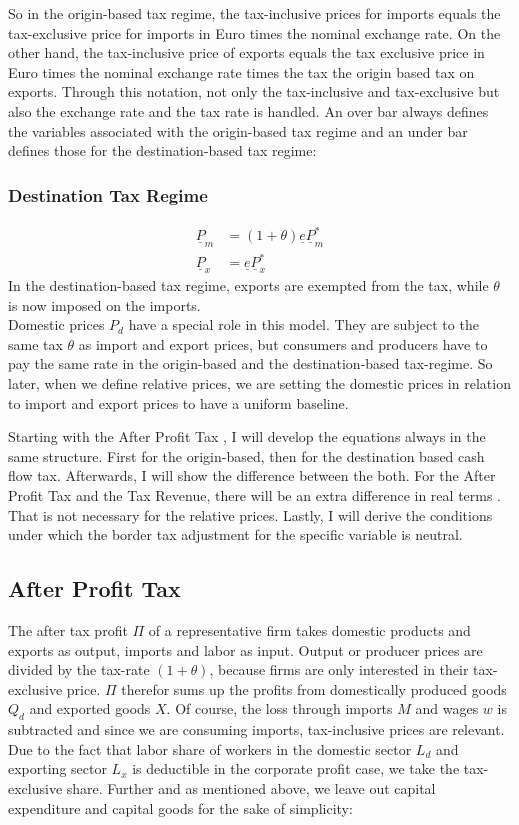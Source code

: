 \noindent So in the origin-based tax regime, the tax-inclusive prices for imports equals the tax-exclusive price for imports in Euro times the nominal exchange rate. On the other hand, the tax-inclusive price of exports equals the tax exclusive price in Euro times the nominal exchange rate times the tax the origin based tax on exports. Through this notation, not only the tax-inclusive and tax-exclusive but also the exchange rate and the tax rate is handled. An over bar always defines the variables associated with the origin-based tax regime and an under bar defines those for the destination-based tax regime:

\subsubsection*{Destination Tax Regime}
\begin{equation}\label{D.Tax}
\begin{aligned}
\underline P_m &=  \left( 1+\theta \right) \underline e\underline P^*_m \\
\underline P_x &= \underline e \underline P^*_x 
\end{aligned}
\end{equation}
In the destination-based tax regime, exports are exempted from the tax, while $\theta$ is now imposed on the imports.\\
Domestic prices $P_d$ have a special role in this model. They are subject to the same tax $\theta$ as import and export prices, but consumers and producers have to pay the same rate in the origin-based and the destination-based tax-regime. So later, when we define relative prices, we are setting the domestic prices in relation to import and export prices to have a uniform baseline. 


Starting with the After Profit Tax , I will develop the equations always in the same structure. First for the origin-based, then for the destination based cash flow tax. Afterwards, I will show the difference between the both. For the After Profit Tax and the Tax Revenue, there will be an extra difference in real terms . That is not necessary for the relative prices. Lastly, I will derive the conditions under which the border tax adjustment for the specific variable is neutral. 


\subsection*{After Profit Tax}
The after tax profit $\Pi$ of a representative firm takes domestic products  and exports as output, imports and labor as input. Output or producer prices are divided by the tax-rate $(1+\theta)$, because firms are only interested in their tax-exclusive price. $\Pi$ therefor sums up the profits from domestically produced goods $Q_d$ and exported goods $X$. Of course, the loss through imports $M$ and wages $w$ is subtracted and since we are consuming imports, tax-inclusive prices are relevant. Due to the fact that labor share of workers in the domestic sector $L_d$ and exporting sector $L_x$ is deductible in the corporate profit case, we take the tax-exclusive share. Further and as mentioned above, we leave out capital expenditure and capital goods for the sake of simplicity:


